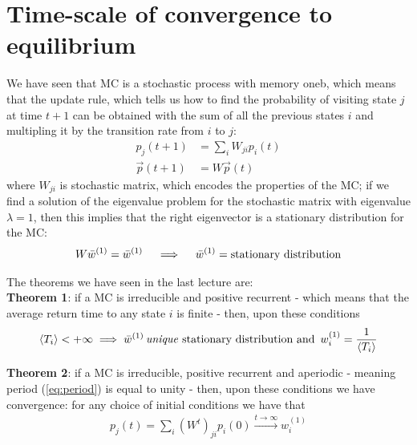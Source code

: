 \documentclass[\main/main.tex]{subfiles}
\begin{document}
\section{Time-scale of convergence to equilibrium}
We have seen that MC is a stochastic process with memory oneb, which means that the update rule, which tells us how to find the probability of visiting state $j$ at time $t+1$ can be obtained with the sum of all the previous states $i$ and multipling it by the transition rate from $i$ to $j$:
\begin{align}
p_j(t+1) &=\sum_i W_{ji}p_i(t) \\
\Vec{p}(t+1) &=W\Vec{p}(t)
\end{align}
where $W_{ji}$ is stochastic matrix, which encodes the properties of the MC; if we find a solution of the eigenvalue problem for the stochastic matrix with eigenvalue $\lambda=1$, then this implies that the right eigenvector is a stationary distribution for the MC:
\begin{eqnarray}
W \Bar{w}^{(1)}=\Bar{w}^{(1)}\quad \implies \quad \Bar{w}^{(1)}=\text{stationary distribution}   
\end{eqnarray}

The theorems we have seen in the last lecture are: \\

\textbf{Theorem 1}: if a MC is irreducible and positive recurrent - which means that the average return time to any state $i$ is finite - then, upon these conditions 
\begin{eqnarray}
   \left\langle T_i \right\rangle<+\infty \implies \Bar{w}^{(1)} \,\text{\textit{{unique}} stationary distribution and }\, w_i^{(1)}=\frac{1}{\left\langle T_i \right\rangle}
\end{eqnarray}

\textbf{Theorem 2}: if a MC is irreducible, positive recurrent and aperiodic - meaning period (\ref{eq:period}) is equal to unity - then, upon these conditions we have convergence: for any choice of initial conditions we have that
\begin{eqnarray}
p_j(t)=\sum_i (W^{t})_{ji}p_i(0)\overset{t\to\infty}{\longrightarrow} w_i^{(1)}
\end{eqnarray}
\end{document}

